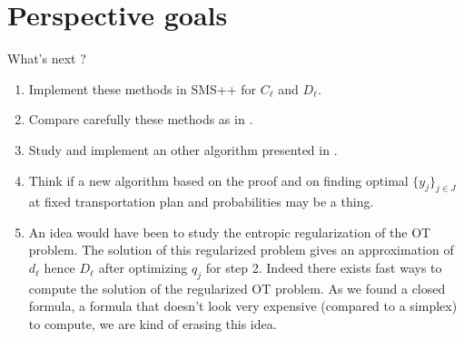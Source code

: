 \documentclass{beamer}
\theoremstyle{plain}
\begin{document}
\section{Perspective goals}
\begin{frame}{What's next ?}
    \begin{enumerate}
        \item \alert{Implement} these methods in SMS++ for $C_\ell$ and $D_\ell$.
        \item \alert{Compare} carefully these methods as in \cite{rujeerapaiboon_scenario_2022}.
        \item Study and implement \alert{an other algorithm} presented in \cite{bertsimas_optimization-based_2023}.
        \item Think if a \alert{new algorithm} based on the proof and on finding optimal $\{y_j\}_{j\in J}$ at fixed transportation plan and probabilities may be a thing.
        \item An idea would have been to study \alert{the entropic regularization of the OT problem}. The solution of this regularized problem gives an approximation of $d_\ell$ hence $D_\ell$ after optimizing $q_j$ for step 2. Indeed there exists \alert{fast ways to compute the solution} of the regularized OT problem. As we found a closed formula, a formula that doesn't look very expensive (compared to a simplex) to compute, we are kind of erasing this idea.   
    \end{enumerate}
\end{frame}


\end{document}

